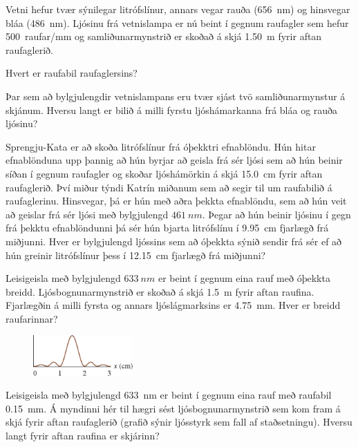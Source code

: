 \begin{enumerate}[label = \textbf{(\alph*)}]

\item[\textbf{(33.13)}] Vetni hefur tvær sýnilegar litrófslínur, annars vegar rauða (\SI{656}{nm}) og hinsvegar bláa (\SI{486}{nm}). Ljósinu frá vetnislampa er nú beint í gegnum raufagler sem hefur \SI{500}{raufar/mm} og samliðunarmynstrið er skoðað á skjá \SI{1.50}{m} fyrir aftan raufaglerið. \begin{enumerate*}[label = \textbf{(\alph*)}]
    \item Hvert er raufabil raufaglersins?
    \item Þar sem að bylgjulengdir vetnislampans eru tvær sjást tvö samliðunarmynstur á skjánum. Hversu langt er bilið á milli fyrstu ljóshámarkanna frá bláa og rauða ljósinu?
\end{enumerate*}

\item[\textbf{(33.46)}] Sprengju-Kata er að skoða litrófslínur frá óþekktri efnablöndu. Hún hitar efnablönduna upp þannig að hún byrjar að geisla frá sér ljósi sem að hún beinir síðan í gegnum raufagler og skoðar ljóshámörkin á skjá \SI{15.0}{cm} fyrir aftan raufaglerið. Því miður týndi Katrín miðanum sem að segir til um raufabilið á raufaglerinu. Hinsvegar, þá er hún með aðra þekkta efnablöndu, sem að hún veit að geislar frá sér ljósi með bylgjulengd $\SI{461}{nm}$. Þegar að hún beinir ljósinu í gegn frá þekktu efnablöndunni þá sér hún bjarta litrófslínu í \SI{9.95}{cm} fjarlægð frá miðjunni. Hver er bylgjulengd ljóssins sem að óþekkta sýnið sendir frá sér ef að hún greinir litrófslínur þess í \SI{12.15}{cm} fjarlægð frá miðjunni?

\item[\textbf{(33.16)}] Leisigeisla með bylgjulengd $\SI{633}{nm}$ er beint í gegnum eina rauf með óþekkta breidd. Ljósbognunarmynstrið er skoðað á skjá \SI{1.5}{m} fyrir aftan raufina. Fjarlægðin á milli fyrsta og annars ljóslágmarksins er \SI{4.75}{mm}. Hver er breidd raufarinnar?

\begin{minipage}{\linewidth}
\begin{figure}
\vspace{-0.5cm}
\includegraphics[width = 1.5in]{figures/rk3318.pdf}
\end{figure}

\item[\textbf{(33.17)}] Leisigeisla með bylgjulengd \SI{633}{nm} er beint í gegnum eina rauf með raufabil \SI{0.15}{mm}. Á myndinni hér til hægri sést ljósbognunarmynstrið sem kom fram á skjá fyrir aftan raufaglerið (grafið sýnir ljósstyrk sem fall af staðsetningu). Hversu langt fyrir aftan raufina er skjárinn?

\end{minipage}

\end{enumerate}

